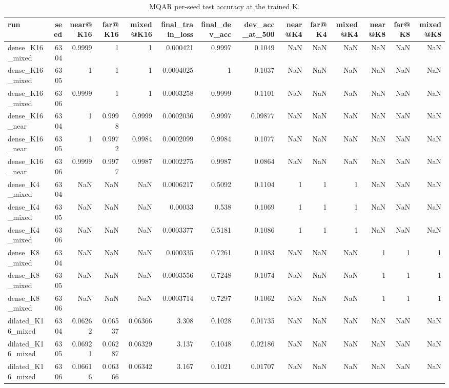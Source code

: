 \begin{table}
\caption{MQAR per-seed test accuracy at the trained K.}
\label{tab:task2b_mqar_per_seed}
\begin{tabular}{lrrrrrrrrrrrrr}
\toprule
run & seed & near@K16 & far@K16 & mixed@K16 & final\_train\_loss & final\_dev\_acc & dev\_acc\_at\_500 & near@K4 & far@K4 & mixed@K4 & near@K8 & far@K8 & mixed@K8 \\
\midrule
dense\_K16\_mixed & 6304 & 0.9999 & 1 & 1 & 0.000421 & 0.9997 & 0.1049 & NaN & NaN & NaN & NaN & NaN & NaN \\
dense\_K16\_mixed & 6305 & 1 & 1 & 1 & 0.0004025 & 1 & 0.1037 & NaN & NaN & NaN & NaN & NaN & NaN \\
dense\_K16\_mixed & 6306 & 0.9999 & 1 & 1 & 0.0003258 & 0.9999 & 0.1101 & NaN & NaN & NaN & NaN & NaN & NaN \\
dense\_K16\_near & 6304 & 1 & 0.9998 & 0.9999 & 0.0002036 & 0.9997 & 0.09877 & NaN & NaN & NaN & NaN & NaN & NaN \\
dense\_K16\_near & 6305 & 1 & 0.9972 & 0.9984 & 0.0002099 & 0.9984 & 0.1077 & NaN & NaN & NaN & NaN & NaN & NaN \\
dense\_K16\_near & 6306 & 0.9999 & 0.9977 & 0.9987 & 0.0002275 & 0.9987 & 0.0864 & NaN & NaN & NaN & NaN & NaN & NaN \\
dense\_K4\_mixed & 6304 & NaN & NaN & NaN & 0.0006217 & 0.5092 & 0.1104 & 1 & 1 & 1 & NaN & NaN & NaN \\
dense\_K4\_mixed & 6305 & NaN & NaN & NaN & 0.00033 & 0.538 & 0.1069 & 1 & 1 & 1 & NaN & NaN & NaN \\
dense\_K4\_mixed & 6306 & NaN & NaN & NaN & 0.0003377 & 0.5181 & 0.1086 & 1 & 1 & 1 & NaN & NaN & NaN \\
dense\_K8\_mixed & 6304 & NaN & NaN & NaN & 0.000335 & 0.7261 & 0.1083 & NaN & NaN & NaN & 1 & 1 & 1 \\
dense\_K8\_mixed & 6305 & NaN & NaN & NaN & 0.0003556 & 0.7248 & 0.1074 & NaN & NaN & NaN & 1 & 1 & 1 \\
dense\_K8\_mixed & 6306 & NaN & NaN & NaN & 0.0003714 & 0.7297 & 0.1062 & NaN & NaN & NaN & 1 & 1 & 1 \\
dilated\_K16\_mixed & 6304 & 0.06262 & 0.06537 & 0.06366 & 3.308 & 0.1028 & 0.01735 & NaN & NaN & NaN & NaN & NaN & NaN \\
dilated\_K16\_mixed & 6305 & 0.06921 & 0.06287 & 0.06329 & 3.137 & 0.1048 & 0.02186 & NaN & NaN & NaN & NaN & NaN & NaN \\
dilated\_K16\_mixed & 6306 & 0.06616 & 0.06366 & 0.06342 & 3.167 & 0.1021 & 0.01707 & NaN & NaN & NaN & NaN & NaN & NaN \\

\end{tabular}
\end{table}
